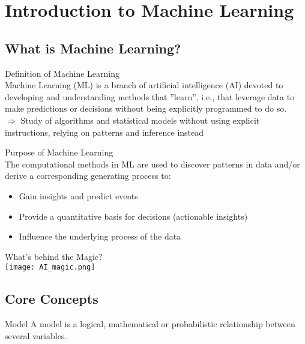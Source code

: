\section{Introduction to Machine Learning}


\subsection{What is Machine Learning?}

\begin{definition}{Definition of Machine Learning}\\
    Machine Learning (ML) is a branch of artificial intelligence (AI) devoted to developing and understanding methods that ''learn'', i.e., that leverage data to make predictions or decisions without being explicitly programmed to do so.\\
    $\Rightarrow$ Study of algorithms and statistical models without using explicit instructions, relying on patterns and inference instead
\end{definition}

\begin{concept}{Purpose of Machine Learning}\\
The computational methods in ML are used to discover patterns in data and/or derive a corresponding generating process to:
\begin{itemize}
    \item Gain insights and predict events
    \item Provide a quantitative basis for decisions (actionable insights)
    \item Influence the underlying process of the data
\end{itemize}
\end{concept}

\begin{definition}{What's behind the Magic?} \\
    \texttt{[image: AI\_magic.png]}
\end{definition}

\subsection{Core Concepts}

\begin{definition}{Model}
A model is a logical, mathematical or probabilistic relationship between several variables.
\end{definition}

